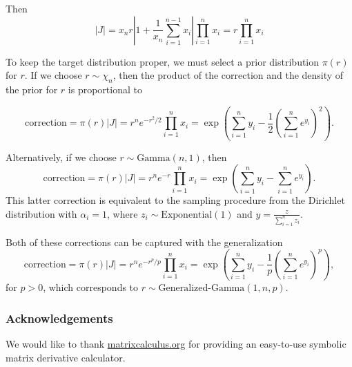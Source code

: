 \documentclass[11pt]{article}
\begin{document}
Then
\[
  |J| = x_n r \left|1 + \frac{1}{x_n}\sum_{i=1}^{n-1} x_i\right|
  \prod_{i=1}^n x_i = r \prod_{i=1}^n x_i
\]

To keep the target distribution proper, we must select a prior
distribution $\pi(r)$ for $r$.  If we choose $r \sim \chi_n$, then the
product of the correction and the density of the prior for $r$ is
proportional to

\[
  \mathrm{correction}
  = \pi(r) |J| = r^n e^{-r^2/2} \prod_{i=1}^n x_i
  = \exp\left(\sum_{i=1}^n y_i - \frac{1}{2}\left(\sum_{i=1}^n
      e^{y_i}\right)^2\right).
\]

Alternatively, if we choose $r \sim \mathrm{Gamma}(n, 1)$, then
\[
  \mathrm{correction} = \pi(r) |J| = r^n e^{-r} \prod_{i=1}^n x_i =
  \exp\left(\sum_{i=1}^n y_i - \sum_{i=1}^n e^{y_i}\right).
\]
This latter correction is equivalent to the sampling procedure from
the Dirichlet distribution with $\alpha_i=1$, where
$z_i \sim \mathrm{Exponential}(1)$ and
$y = \frac{z}{\sum_{i=1}^n z_i}$.

Both of these corrections can be captured with the generalization
\[
  \mathrm{correction}
  = \pi(r) |J|
  = r^n e^{-r^p/p} \prod_{i=1}^n x_i
  = \exp\left(\sum_{i=1}^n y_i - \frac{1}{p} \left(\sum_{i=1}^n e^{y_i}\right)^p\right),
\]
for $p > 0$, which corresponds to $r \sim \text{Generalized-Gamma}(1, n, p)$.


\subsubsection*{Acknowledgements}

We would like to thank \url{matrixcalculus.org} for providing an
easy-to-use symbolic matrix derivative calculator.



{}

\end{document}
